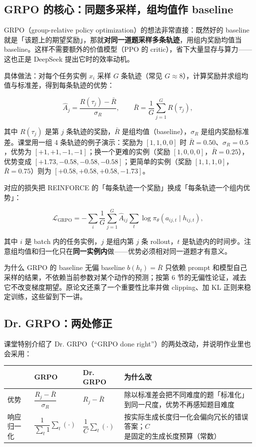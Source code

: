 \documentclass[a4paper]{article}
\begin{document}
\subsection{GRPO 的核心：同题多采样，组均值作 baseline}

GRPO（group-relative policy optimization）的想法非常直接：既然好的 baseline 就是「该题上的期望奖励」，那就\textbf{对同一道题采样多条轨迹}，用组内奖励均值当 baseline。这样不需要额外的价值模型（PPO 的 critic），省下大量显存与算力——这也正是 DeepSeek 提出它时的效率动机。

具体做法：对每个任务实例 $x_i$ 采样 $G$ 条轨迹（常见 $G\approx 8$），计算奖励并求组均值与标准差，得到每条轨迹的优势：

$$
\hat A_j = \frac{R(\tau_j) - \bar R}{\sigma_R}, \qquad
\bar R = \frac{1}{G}\sum_{j=1}^{G} R(\tau_j),
$$

其中 $R(\tau_j)$ 是第 $j$ 条轨迹的奖励，$\bar R$ 是组均值（baseline），$\sigma_R$ 是组内奖励标准差。课堂用一组 4 条轨迹的例子演示：奖励为 $[1,1,0,0]$ 时 $\bar R=0.50$、$\sigma_R=0.5$，优势为 $[+1,+1,-1,-1]$；换一个更难的实例（奖励 $[1,0,0,0]$，$\bar R=0.25$），优势变成 $[+1.73,-0.58,-0.58,-0.58]$；更简单的实例（奖励 $[1,1,1,0]$，$\bar R=0.75$）则为 $[+0.58,+0.58,+0.58,-1.73]$。

对应的损失把 REINFORCE 的「每条轨迹一个奖励」换成「每条轨迹一个组内优势」：

$$
\mathcal{L}_{\text{GRPO}} = -\sum_{i} \frac{1}{G}\sum_{j=1}^{G} \hat A_{ij} \sum_{t} \log \pi_\theta(a_{ij,t} \mid h_{ij,t}),
$$

其中 $i$ 是 batch 内的任务实例，$j$ 是组内第 $j$ 条 rollout，$t$ 是轨迹内的时间步。注意组均值和归一化只在\textbf{同一实例内}做——优势必须相对同一道题才有意义。

\begin{knowledgebox}{为什么 GRPO 的 baseline 无偏}
baseline $b(h_t)=\bar R$ 只依赖 prompt 和模型自己采样的结果，不依赖当前参数对某个动作的预测；按第 6 节的无偏性论证，减去它不改变梯度期望。原论文还乘了一个重要性比率并做 clipping、加 KL 正则来稳定训练，这些留到下一讲。
\end{knowledgebox}

\subsection{Dr. GRPO：两处修正}

课堂特别介绍了 Dr. GRPO（``GRPO done right''）的两处改动，并说明作业里也会采用：

\begin{center}
\begin{tabular}{p{2.0cm}p{2.4cm}p{2.4cm}p{4.4cm}}
\toprule
 & GRPO & Dr. GRPO & 为什么改 \\
\midrule
优势 & $\dfrac{R_j-\bar R}{\sigma_R}$ & $R_j-\bar R$ & 除以标准差会把不同难度的题「标准化」到同一尺度，优势不再感知题目难度 \\
响应归一化 & $\dfrac{1}{\sum_t 1}\sum_t(\cdot)$ & $\dfrac{1}{C}\sum_t(\cdot)$ & 按实际生成长度归一化会偏向冗长的错误答案；$C$ 是固定的生成长度预算（常数） \\
\bottomrule
\end{tabular}
\end{center}
\end{document}
